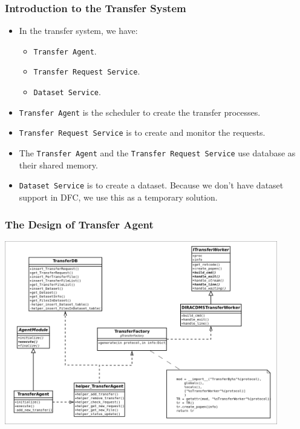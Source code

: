 \begin{frame}
    \frametitle{Introduction to the Transfer System}
    \begin{itemize}
        \item In the transfer system, we have:
        \begin{itemize}
            \item {\tt Transfer Agent}.
            \item {\tt Transfer Request Service}.
            \item {\tt Dataset Service}.
        \end{itemize}
        \item {\tt Transfer Agent} is the scheduler to create the transfer 
              processes.
        \item {\tt Transfer Request Service} is to create and monitor the requests.
        \item The {\tt Transfer Agent} and the {\tt Transfer Request Service} 
              use database as their shared memory.
        \item {\tt Dataset Service} is to create a dataset. Because we don't have
              dataset support in DFC, we use this as a temporary solution.

    \end{itemize}
\end{frame}

\begin{frame}
    \frametitle{The Design of Transfer Agent}
    \includegraphics[height=8cm,keepaspectratio]{data/TransferAgent.png}
\end{frame}

